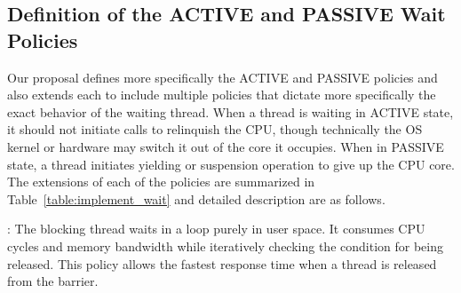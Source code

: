 \subsection{Definition of the {\sf ACTIVE} and {\sf PASSIVE} Wait Policies}
Our proposal defines more specifically 
the {\sf ACTIVE} and {\sf PASSIVE} policies and also extends each to include multiple policies that dictate more
specifically the exact behavior of the waiting thread. 
When a thread is waiting in {\sf ACTIVE} state, it should not initiate calls to
relinquish the CPU, though technically the OS kernel or hardware may switch it out of the core it occupies. 
When in {\sf PASSIVE} state, a thread initiates yielding or suspension operation to give up the CPU core. 
The extensions of each of the policies are summarized in Table~\ref{table:implement_wait} and detailed description
 are as follows. %
\begin{table}[ht]
	\centering
{}
\label{table:implement_wait}
\caption{Wait Policies}
\end{table}

{}: The blocking thread waits in a loop purely in user space. 
		It consumes CPU cycles and memory bandwidth while iteratively checking
		the condition for being released. This policy allows the fastest response time when a thread is
		released from the barrier. 

